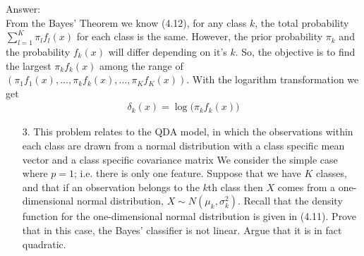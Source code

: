\documentclass[12pt,a4paper]{article}%
\theoremstyle{definition}
\theoremstyle{plain}
\numberwithin{equation}{section}
\begin{document}
\begin{oframed}
Answer: ~\\
From the Bayes' Theorem we know (4.12), for any class $k$, the total probability $\sum\limits_{l=1}^{K} \pi_{l} f_{l}(x)$ for each class is the same.
However, the prior probability $\pi_{k}$ and the probability $f_{k}(x)$ will differ depending on it's $k$. 
So, the objective is to find the largest $\pi_{k}f_{k}(x)$ among the range of $(\pi_{1}f_{1}(x),\dots,\pi_{k}f_{k}(x), \dots,\pi_{K}f_{K}(x))$.
With the logarithm transformation we get 
\begin{gather*}
\delta_{k}(x) = \log \big(\pi_{k}f_{k}(x)\big)
\end{gather*}
\end{oframed}
\begin{enumerate}
\item[3.] This problem relates to the QDA model, in which the observations within each class are drawn from a normal distribution with a class specific mean vector and a class specific covariance matrix
We consider the simple case where $p = 1$; i.e. there is only one feature.
Suppose that we have $K$ classes, and that if an observation belongs to the $k$th class then $X$ comes from a one-dimensional normal distribution, $X \sim N(\mu_{k}, \sigma_{k}^{2})$.
Recall that the density function for the one-dimensional normal distribution is given in (4.11).
Prove that in this case, the Bayes' classifier is not linear. Argue that it is in fact quadratic.
\end{enumerate}
\end{document}
